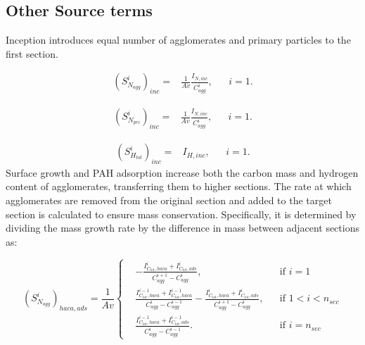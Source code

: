 \subsection{Other Source terms}
\label{sec:sectothersource}

Inception introduces equal number of agglomerates and primary particles to the first section.

\begin{equation}
	\begin{aligned}
		\left(S^i_{N_{agg}}\right)_{inc} =
		&\frac{1}{Av}\frac{I_{N, inc}}{C^i_{agg}}, && i=1.
	\end{aligned}
	\label{eqn:S_Nagg_incsect}
\end{equation}

\begin{equation}
	\begin{aligned}
		\left(S^i_{N_{pri}}\right)_{inc} =
		&\frac{1}{Av}\frac{I_{N, inc}}{C^i_{agg}}, && i=1.
	\end{aligned}
	\label{eqn:S_Npri_incsect}
\end{equation}

\begin{equation}
	\begin{aligned}
		\left(S^i_{H_{tot}}\right)_{inc} =
		&I_{H, inc}, && i=1.
	\end{aligned}
	\label{eqn:S_Htot_incsect}
\end{equation}
Surface growth and PAH adsorption increase both the carbon mass and hydrogen content of agglomerates, transferring them to higher sections. The rate at which agglomerates are removed from the original section and added to the target section is calculated to ensure mass conservation. Specifically, it is determined by dividing the mass growth rate by the difference in mass between adjacent sections as:


\begin{equation}
	\left(S^i_{N_{agg}}\right)_{haca, ads}=
	\frac{1}{Av}
	\left\{
	\begin{aligned}
		&-\frac{I^i_{C_{tot},haca}+I^i_{C_{tot},ads}}{C^{i+1}_{agg}-C^{i}_{agg}},
		&&
		\text{if } i = 1
		\\
		&\frac{I^{i-1}_{C_{tot},haca}+I^{i-1}_{C_{tot},haca}}{C^{i}_{agg}-C^{i-1}_{agg}}
		-\frac{I^{i}_{C_{tot},haca}+I^{i}_{C_{tot},ads}}{C^{i+1}_{agg}-C^{i}_{agg}},
		&&
		\text{if } 1 < i < n_{sec}
		\\
		&\frac{I^{i-1}_{C_{tot},haca}+I^{i-1}_{C_{tot},ads}}{C^{i}_{agg}-C^{i-1}_{agg}}.
		&&\text{if } i=n_{sec}
	\end{aligned}
	\right.
	\label{eqn:S_Nagg_gradssect}
\end{equation}

